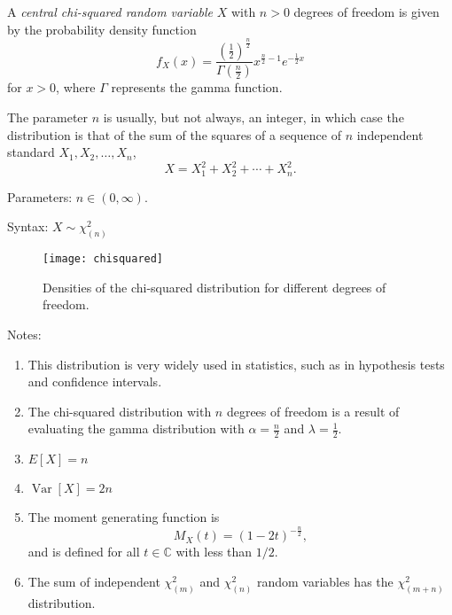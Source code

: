 \documentclass[12pt]{article}
\def\Var{\operatorname{Var}}
\begin{document}

A \emph{central chi-squared random variable} $X$ with $n>0$ degrees of freedom is given by the probability density function
\[
  f_X(x) = \frac{ (\frac{1}{2})^{\frac{n}{2}} } {\Gamma(\frac{n}{2})}
           x^{\frac{n}{2} - 1} e^{- \frac{1}{2} x} 
\]
for $x > 0$, where $\Gamma$ represents the gamma function.

The parameter $n$ is usually, but not always, an integer, in which case the distribution is that of the sum of the squares of a sequence of $n$ independent standard  $X_1,X_2,\ldots,X_n$,
\begin{equation*}
X=X_1^2+X_2^2+\cdots+X_n^2.
\end{equation*}

Parameters: $n\in(0,\infty)$.

Syntax: $X\sim \chi_{(n)}^{2}$

\begin{figure}[h]
\centering
\texttt{[image: chisquared]}
\caption{Densities of the chi-squared distribution for different degrees of freedom.}
\end{figure}

Notes:

\begin{enumerate}

\item This distribution is very widely used in statistics, such as in hypothesis tests and confidence intervals.
\item The chi-squared distribution with $n$ degrees of freedom is a result of evaluating the gamma distribution with $\alpha = \frac{n}{2}$ and $\lambda = \frac{1}{2}$.
\item $E[X] = n$
\item $\Var[X] = 2n$
\item The moment generating function is
\begin{equation*}
M_X(t) = \left(1 - 2t\right)^{-\frac{n}{2}},
\end{equation*}
and is defined for all $t\in\mathbb{C}$ with  less than $1/2$.
\item The sum of independent $\chi_{(m)}^2$ and $\chi_{(n)}^2$ random variables has the $\chi_{(m+n)}^2$ distribution.
\end{enumerate}

\end{document}
